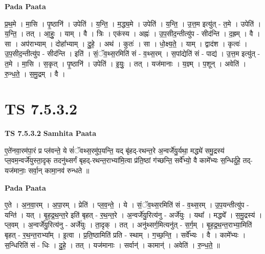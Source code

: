 \documentclass[17pt]{extarticle}
\begin{document}
\textbf{Pada Paata} \newline

प्र॒थ॒मे । मा॒सि । पृ॒ष्ठानि॑ । उपेति॑ । य॒न्ति॒ । म॒द्ध्य॒मे । उपेति॑ । य॒न्ति॒ । उ॒त्त॒म इत्यु॑त् - त॒मे । उपेति॑ । य॒न्ति॒ । तत् । आ॒हुः॒ । याम् । वै । त्रिः । एक॑स्य । अह्नः॑ । उ॒प॒सीद॒न्तीत्यु॑प - सीद॑न्ति । द॒ह्रम् । वै । सा । अप॑राभ्याम् । दोहा᳚भ्याम् । दु॒हे॒ । अथ॑ । कुतः॑ । सा । धो॒क्ष्य॒ते॒ । याम् । द्वाद॑श । कृत्वः॑ । उ॒प॒सीद॒न्तीत्यु॑प - सीद॑न्ति । इति॑ । सं॒ॅव॒थ्स॒रमिति॑ सं - व॒थ्स॒रम् । स॒पांद्येति॑ सं - पाद्य॑ । उ॒त्त॒म इत्यु॑त् - त॒मे । मा॒सि । स॒कृत् । पृ॒ष्ठानि॑ । उपेति॑ । इ॒युः॒ । तत् । यज॑मानाः । य॒ज्ञ्म् । प॒शून् । अवेति॑ । रु॒न्ध॒ते॒ । स॒मु॒द्रम् । वै ।  \newline





\section{ TS 7.5.3.2 }

\textbf{TS 7.5.3.2 } \newline
\textbf{Samhita Paata} \newline

ए॒ते॑नवा॒रम॑पा॒रं प्र प्ल॑वन्ते॒ ये सं॑ॅवथ्स॒रमु॑प॒यन्ति॒ यद् बृ॑हद्-रथन्त॒रे अ॒न्वर्जे॑यु॒र्यथा॒ मद्ध्ये॑ समु॒द्रस्य॑ प्ल॒वम॒न्वर्जे॑युस्ता॒दृक् तदनु॑थ्सर्गं बृहद्-रथन्त॒राभ्या॑मि॒त्वा प्र॑ति॒ष्ठां ग॑च्छन्ति॒ सर्वे᳚भ्यो॒ वै कामे᳚भ्यः स॒न्धिर्दु॑हे॒ तद्-यज॑मानाः॒ सर्वा॒न् कामा॒नव॑ रुन्धते ॥ \newline

\textbf{Pada Paata} \newline

ए॒ते । अ॒न॒वा॒रम् । अ॒पा॒रम् । प्रेति॑ । प्ल॒व॒न्ते॒ । ये । सं॒ॅव॒थ्स॒रमिति॑ सं - व॒थ्स॒रम् । उ॒प॒यन्तीत्यु॑प - यन्ति॑ । यत् । बृ॒ह॒द्र॒थ॒न्त॒रे इति॑ बृहत् - र॒थ॒न्त॒रे । अ॒न्वर्जे॑यु॒रित्य॑नु - अर्जे॑युः । यथा᳚ । मद्ध्ये᳚ । स॒मु॒द्रस्य॑ । प्ल॒वम् । अ॒न्वर्जे॑यु॒रित्य॑नु - अर्जे॑युः । ता॒दृक् । तत् । अनु॑थ्सर्ग॒मित्यनु॑त् - स॒र्ग॒म् । बृ॒ह॒द्र॒थ॒न्त॒राभ्या॒मिति॑ बृहत् - र॒थ॒न्त॒राभ्या᳚म् । इ॒त्वा । प्र॒ति॒ष्ठामिति॑ प्रति -  स्थाम् । ग॒च्छ॒न्ति॒ । सर्वे᳚भ्यः । वै । कामे᳚भ्यः । स॒न्धिरिति॑ सं - धिः । दु॒हे॒ । तत् । यज॑मानाः ।  सर्वान्॑ । कामान्॑ । अवेति॑ । रु॒न्ध॒ते॒ ॥  \newline




\end{document}

